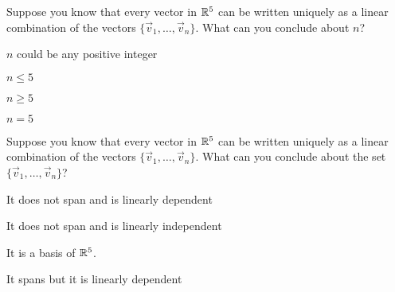 \begin{readinessAssuranceTest}
\item Suppose you know that every vector in $\mathbb{R}^5$ can be written uniquely as a linear combination of the vectors $\{\vec{v}_1, \ldots, \vec{v}_n\}$.  What can you conclude about $n$?
\begin{readinessAssuranceTestChoices}
\item $n$ could be any positive integer
\item $n \leq 5$
\item $n \geq 5$
\item $n=5$
\end{readinessAssuranceTestChoices}

\item Suppose you know that every vector in $\mathbb{R}^5$ can be written uniquely as a linear combination of the vectors $\{\vec{v}_1, \ldots, \vec{v}_n\}$.  What can you conclude about the set $\{\vec{v}_1, \ldots, \vec{v}_n\}$?
\begin{readinessAssuranceTestChoices}
\item It does not span and is linearly dependent
\item It does not span and is linearly independent
\item It is a basis of $\mathbb{R}^5$.
\item It spans but it is linearly dependent
\end{readinessAssuranceTestChoices}

\end{readinessAssuranceTest}
